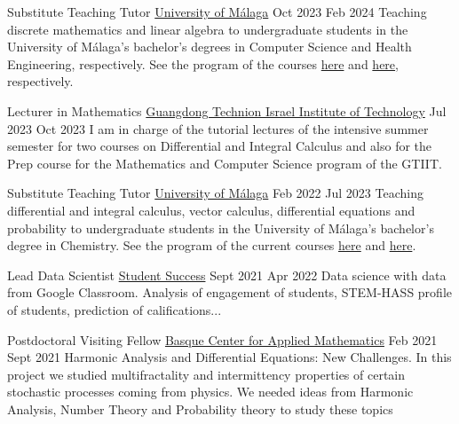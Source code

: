 \nopagebreak

\begin{employment}
    {Substitute Teaching Tutor}
    {\href{https://www.uma.es/}{University of Málaga}}
    {Oct 2023}
    {Feb 2024}
    {Teaching discrete mathematics and linear algebra to undergraduate students in the University of Málaga's bachelor's degrees in Computer Science and Health Engineering, respectively. See the program of the courses \href{https://sara.uma.es/ht/2023/ProgramasAsignaturas_Titulacion_5389_AsigUMA_55366.pdf}{here} and \href{https://sara.uma.es/ht/2023/ProgramasAsignaturas_Titulacion_5157_AsigUMA_53012.pdf}{here}, respectively.}
\end{employment}

\begin{employment}
		{Lecturer in Mathematics}
		{\href{https://www.gtiit.edu.cn/en/}{Guangdong Technion Israel Institute of Technology}}
		{Jul 2023}
		{Oct 2023}
		{I am in charge of the tutorial lectures of the intensive summer semester for two courses on Differential and Integral Calculus and also for the Prep course for the Mathematics and Computer Science program of the GTIIT.}
\end{employment}

\begin{employment}
    {Substitute Teaching Tutor}
    {\href{https://www.uma.es/}{University of Málaga}}
    {Feb 2022}
    {Jul 2023}
    {Teaching differential and integral calculus, vector calculus, differential equations and probability to undergraduate students in the University of Málaga's bachelor's degree in Chemistry. See the program of the current courses \href{https://oas.sci.uma.es:8443/ht/2022/ProgramasAsignaturas_Titulacion_5004_AsigUMA_51634.pdf}{here} and \href{https://oas.sci.uma.es:8443/ht/2022/ProgramasAsignaturas_Titulacion_5004_AsigUMA_51639.pdf}{here}.}
\end{employment}

\begin{employment}
    {Lead Data Scientist}
    {\href{https://studentsuccess.app/es/}{Student Success}}
    {Sept 2021}
    {Apr 2022}
    {Data science with data from Google Classroom. Analysis of  engagement of students, STEM-HASS profile of students, prediction of  califications...}
\end{employment}

\begin{employment}
    {Postdoctoral Visiting Fellow}
    { \href{http://www.bcamath.org/es/}{Basque Center for Applied Mathematics}}
    {Feb 2021}
    {Sept 2021}
    {Harmonic Analysis and Differential Equations: New Challenges. In this project we studied multifractality and intermittency properties of certain stochastic processes coming from physics. We needed ideas from Harmonic Analysis, Number Theory and Probability theory to study these topics}
\end{employment}

